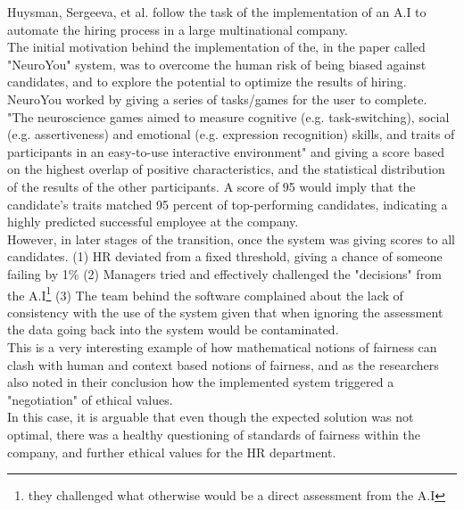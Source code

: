 Huysman, Sergeeva, et al. follow the task of the implementation of an A.I to automate the hiring process in a large multinational company. \cite{vSH19} \\
The initial motivation behind the implementation of the, in the paper called "NeuroYou" system, was to overcome the human risk of being biased against candidates, and to explore the potential to optimize the results of hiring. \\
NeuroYou worked by giving a series of tasks/games for the user to complete. "The neuroscience games aimed to measure cognitive (e.g. task-switching), social (e.g. assertiveness) and emotional (e.g. expression recognition) skills, and traits of participants in an easy-to-use interactive environment" \cite{vSH19} and giving a score based on the highest overlap of positive characteristics, and the statistical distribution of the results of the other participants. A score of 95 would imply that the candidate’s traits matched 95 percent of top-performing candidates, indicating a highly predicted successful employee at the company.\\
However, in later stages of the transition, once the system was giving scores to all candidates. (1) HR deviated from a fixed threshold, giving a chance of someone failing by 1\% (2) Managers tried and effectively challenged the "decisions" from the A.I\footnote{they challenged what otherwise would be a direct assessment from the A.I} (3) The team behind the software complained about the lack of consistency with the use of the system given that when ignoring the assessment the data going back into the system would be contaminated.\\
This is a very interesting example of how mathematical notions of fairness can clash with human and context based notions of fairness, and as the researchers also noted in their conclusion how the implemented system triggered a "negotiation" of ethical values. \\
In this case, it is arguable that even though the expected solution was not optimal, there was a healthy questioning of standards of fairness within the company, and further ethical values for the HR department.
